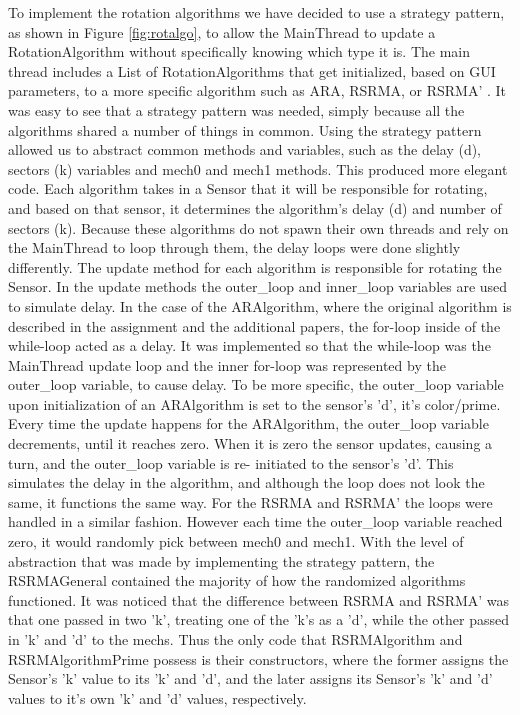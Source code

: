 To implement the rotation algorithms we have decided to use a strategy pattern, as shown in 
Figure \ref{fig:rotalgo}, to allow the MainThread to update a RotationAlgorithm without 
specifically knowing which type it is. The main thread includes a List of RotationAlgorithms 
that get initialized, based on GUI parameters, to a more specific algorithm such as ARA, 
RSRMA, or RSRMA' . It was easy to see that a strategy pattern was needed, simply because all 
the algorithms shared a number of things in common. Using the strategy pattern allowed us to 
abstract common methods and variables, such as the delay (d), sectors (k) variables and mech0 
and mech1 methods. This produced more elegant code. Each algorithm takes in a Sensor that it 
will be responsible for rotating, and based on that sensor, it determines the algorithm's 
delay (d) and number of sectors (k).  Because these algorithms do not spawn their own threads 
and rely on the MainThread to loop through them, the delay loops were done slightly 
differently. The update method for each algorithm is responsible for rotating the Sensor. In 
the update methods the outer\_loop and inner\_loop variables are used to simulate delay. In the 
case of the ARAlgorithm, where the original algorithm is described in the assignment and the 
additional papers, the for-loop inside of the while-loop acted as a delay. It was implemented 
so that the while-loop was the MainThread update loop and the inner for-loop was represented 
by the outer\_loop variable, to cause delay. To be more specific, the outer\_loop variable upon 
initialization of an ARAlgorithm is set to the sensor's 'd', it's color/prime. Every time the 
update happens for the ARAlgorithm, the outer\_loop variable decrements, until it reaches zero. 
When it is zero the sensor updates, causing a turn, and the outer\_loop variable is re-
initiated to the sensor's 'd'. This simulates the delay in the algorithm, and although the 
loop does not look the same, it functions the same way. For the RSRMA and RSRMA' the loops 
were handled in a similar fashion. However each time the outer\_loop variable reached zero, it 
would randomly pick between mech0 and mech1. With the level of abstraction that was made by 
implementing the strategy pattern, the RSRMAGeneral contained the majority of how the 
randomized algorithms functioned. It was noticed that the difference between RSRMA and RSRMA' 
was that one passed in two 'k', treating one of the 'k's as a 'd', while the other passed in 
'k' and 'd' to the mechs. Thus the only code that RSRMAlgorithm and RSRMAlgorithmPrime possess 
is their constructors, where the former assigns the Sensor's 'k' value to its 'k' and 'd', and 
the later assigns its Sensor's 'k' and 'd' values to it's own 'k' and 'd' values, 
respectively.


